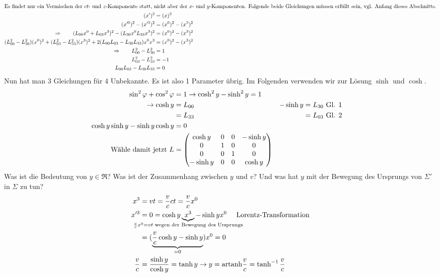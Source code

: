 \begin{align*}
\intertext{Es findet nur ein Vermischen der $ct$- und $z$-Komponente statt, nicht aber der $x$- und $y$-Komponenten. Folgende beide Gleichungen müssen erfüllt sein, vgl. Anfang dieses Abschnitts.}
(x')^2 &= (x)^2\\
(x'^0)^2 - (x'^3)^2 &= (x^0)^2 - (x^3)^2\\
\Rightarrow \qquad (L_{00}x^0 + L_{03}x^3)^2 - (L_{30} x^0 L_{33}x^3)^2 &= (x^0)^2 - (x^3)^2\\
(L_{00}^2-L_{30}^2)(x^0)^2 + (L_{03}^2 - L_{33}^2)(x^3)^2 + 2(L_{00}L_{03} - L_{30} L_{33})x^0 x^3 &= (x^0)^2 - (x^3)^2\\
\Rightarrow \qquad L_{00}^2 - L_{30}^2 &= 1\\
L_{03}^2 - L_{33}^2 &= -1\\
L_{00}L_{03} - L_{30}L_{33} &= 0
\end{align*}
Nun hat man 3 Gleichungen für 4 Unbekannte. Es ist also 1 Parameter übrig. Im Folgenden verwenden wir zur Lösung $\sinh$ und $\cosh$.
\begin{align*}
\sin^2 \varphi + \cos^2\varphi &= 1 \rightarrow \cosh^2 y - \sinh^2 y = 1\\
\rightarrow \cosh y &= L_{00}  & -\sinh y &= L_{30} \text{~Gl. 1}\\
&= L_{33} &  &= L_{03} \text{~Gl. 2}\\
\cosh y \sinh y - \sinh y \cosh y &= 0\\
\text{Wähle  damit jetzt~}
L &= \begin{pmatrix}
\cosh y & 0 & 0 & - \sinh y\\
0 & 1 & 0 & 0\\
0 & 0 & 1 & 0\\
-\sinh y & 0 & 0 & \cosh y 
\end{pmatrix}
\end{align*}
Was ist die Bedeutung von $y \in \Re$? Was ist der Zusammenhang zwischen $y$ und $v$? Und was hat $y$ mit der Bewegung des Ursprungs von $\Sigma'$ in $\Sigma$ zu tun?
\begin{align*}
x^3 &= v t = \frac{v}{c} c t = \frac{v}{c} x^0\\
x'^3 &= 0 = \cosh y \underbrace{x^3}_{\text{\hspace{-10em}}\frac{v}{c} x^0 = v t \text{~wegen der Bewegung des Ursprungs}\text{\hspace{-10em}}} - \sinh y x^0 \text{~~~~Lorentz-Transformation}\\
&= (\underbrace{\frac{v}{c} \cosh y - \sinh y}_{=0})x^0 = 0\\
\frac{v}{c} &= \frac{\sinh y}{\cosh y} = \tanh y \rightarrow y = \text{artanh}\frac{v}{c} = \tanh^{-1} \frac{v}{c}
\end{align*}
